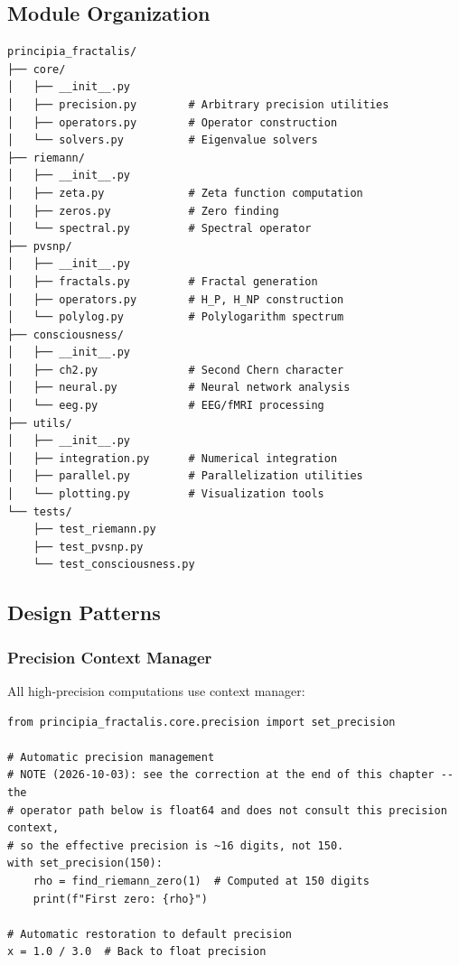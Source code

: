 \subsection{Module Organization}

\begin{verbatim}
principia_fractalis/
├── core/
│   ├── __init__.py
│   ├── precision.py        # Arbitrary precision utilities
│   ├── operators.py        # Operator construction
│   └── solvers.py          # Eigenvalue solvers
├── riemann/
│   ├── __init__.py
│   ├── zeta.py             # Zeta function computation
│   ├── zeros.py            # Zero finding
│   └── spectral.py         # Spectral operator
├── pvsnp/
│   ├── __init__.py
│   ├── fractals.py         # Fractal generation
│   ├── operators.py        # H_P, H_NP construction
│   └── polylog.py          # Polylogarithm spectrum
├── consciousness/
│   ├── __init__.py
│   ├── ch2.py              # Second Chern character
│   ├── neural.py           # Neural network analysis
│   └── eeg.py              # EEG/fMRI processing
├── utils/
│   ├── __init__.py
│   ├── integration.py      # Numerical integration
│   ├── parallel.py         # Parallelization utilities
│   └── plotting.py         # Visualization tools
└── tests/
    ├── test_riemann.py
    ├── test_pvsnp.py
    └── test_consciousness.py
\end{verbatim}

\subsection{Design Patterns}

\subsubsection{Precision Context Manager}

All high-precision computations use context manager:

\begin{verbatim}
from principia_fractalis.core.precision import set_precision

# Automatic precision management
# NOTE (2026-10-03): see the correction at the end of this chapter -- the
# operator path below is float64 and does not consult this precision context,
# so the effective precision is ~16 digits, not 150.
with set_precision(150):
    rho = find_riemann_zero(1)  # Computed at 150 digits
    print(f"First zero: {rho}")

# Automatic restoration to default precision
x = 1.0 / 3.0  # Back to float precision
\end{verbatim}

